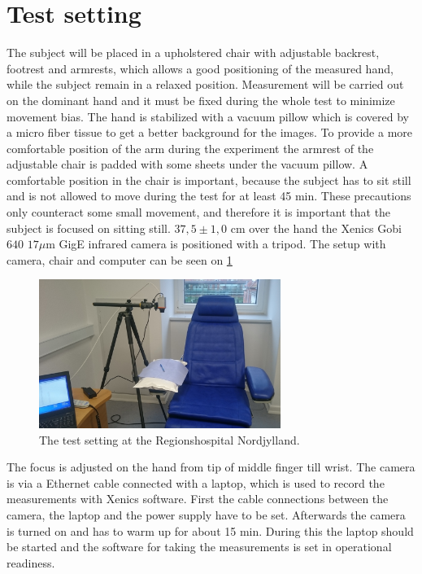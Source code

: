 \section{Test setting}

The subject will be placed in a upholstered chair with adjustable backrest, footrest and armrests, which allows a good positioning of the measured hand, while the subject remain in a relaxed position. Measurement will be carried out on the dominant hand and it must be fixed during the whole test to minimize movement bias. The hand is stabilized with a vacuum pillow which is covered by a micro fiber tissue to get a better background for the images. To provide a more comfortable position of the arm during the experiment the armrest of the adjustable chair is padded with some sheets under the vacuum pillow. A comfortable position in the chair is important, because the subject has to sit still and is not allowed to move during the test for at least 45 min. These precautions only counteract some small movement, and therefore it is important that the subject is focused on sitting still. 
$37,5\pm 1,0$ cm over the hand the Xenics Gobi $640$ $17\mu$m GigE infrared camera is positioned with a tripod. The setup with camera, chair and computer can be seen on \cref{fig:setting} 


\begin{figure}[H]
	\includegraphics[width=0.7\textwidth]{figures/setting}
	\caption{The test setting at the Regionshospital Nordjylland.}
	\label{fig:setting}
\end{figure}

The focus is adjusted on the hand from tip of middle finger till wrist.
The camera is via a Ethernet cable connected with a laptop, which is used to record the measurements with Xenics software. 
First the cable connections between the camera, the laptop and the power supply have to be set. Afterwards the camera is turned on and has to warm up for about 15 min. During this the laptop should be started and the software for taking the measurements is set in operational readiness.

